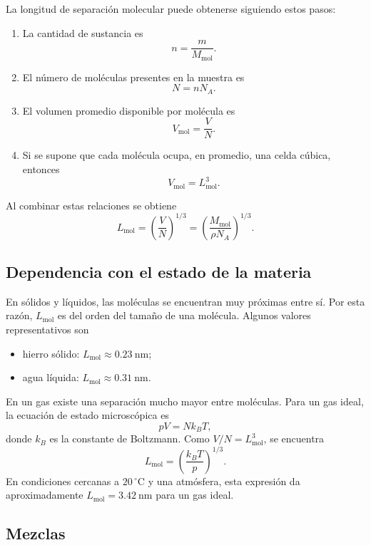 La longitud de separación molecular puede obtenerse siguiendo estos pasos:
\begin{enumerate}
    \item La cantidad de sustancia es
    $$
        n = \frac{m}{M_{\mathrm{mol}}}.
    $$

    \item El número de moléculas presentes en la muestra es
    $$
        N = nN_A.
    $$

    \item El volumen promedio disponible por molécula es
    $$
        V_{\mathrm{mol}} = \frac{V}{N}.
    $$

    \item Si se supone que cada molécula ocupa, en promedio, una celda cúbica,
    entonces
    $$
        V_{\mathrm{mol}} = L_{\mathrm{mol}}^3.
    $$
\end{enumerate}

Al combinar estas relaciones se obtiene
$$
    \boxed{
    L_{\mathrm{mol}}
    = \left(\frac{V}{N}\right)^{1/3}
    = \left(\frac{M_{\mathrm{mol}}}{\rho N_A}\right)^{1/3}}
    .
$$

\subsection{Dependencia con el estado de la materia}

En sólidos y líquidos, las moléculas se encuentran muy próximas entre sí. Por
esta razón, $L_{\mathrm{mol}}$ es del orden del tamaño de una molécula. Algunos
valores representativos son
\begin{itemize}
    \item hierro sólido: $L_{\mathrm{mol}}\approx 0.23\ \mathrm{nm}$;
    \item agua líquida: $L_{\mathrm{mol}}\approx 0.31\ \mathrm{nm}$.
\end{itemize}

En un gas existe una separación mucho mayor entre moléculas. Para un gas ideal,
la ecuación de estado microscópica es
$$
    pV = Nk_B T,
$$
donde $k_B$ es la constante de Boltzmann. Como $V/N=L_{\mathrm{mol}}^3$, se
encuentra
$$
    \boxed{L_{\mathrm{mol}} =
    \left(\frac{k_B T}{p}\right)^{1/3}}.
$$
En condiciones cercanas a $20\,^{\circ}\mathrm{C}$ y una atmósfera, esta
expresión da aproximadamente $L_{\mathrm{mol}}=3.42\ \mathrm{nm}$ para un gas
ideal.

\subsection{Mezclas}

